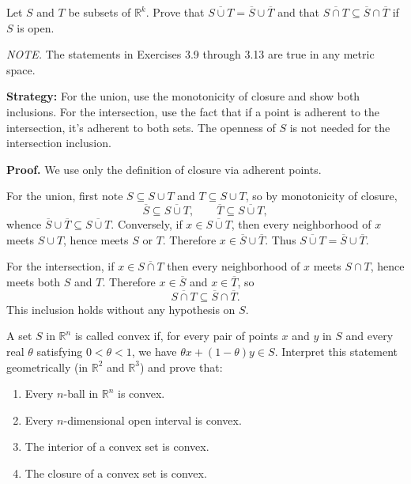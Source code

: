 \begin{problembox}

Let $S$ and $T$ be subsets of $\mathbb{R}^k$. Prove that $\overline{S \cup T} = \overline{S} \cup \overline{T}$ and that $\overline{S \cap T} \subseteq \overline{S} \cap \overline{T}$ if $S$ is open.

\textit{NOTE.} The statements in Exercises 3.9 through 3.13 are true in any metric space.
\end{problembox}

\noindent\textbf{Strategy:} For the union, use the monotonicity of closure and show both inclusions. For the intersection, use the fact that if a point is adherent to the intersection, it's adherent to both sets. The openness of $S$ is not needed for the intersection inclusion.

\noindent\textbf{Proof.}
We use only the definition of closure via adherent points.

For the union, first note $S\subseteq S\cup T$ and $T\subseteq S\cup T$, so by monotonicity of closure,
\[\overline S\subseteq \overline{S\cup T},\qquad \overline T\subseteq \overline{S\cup T},\]
whence $\overline S\cup\overline T\subseteq \overline{S\cup T}$. Conversely, if $x\in \overline{S\cup T}$, then every neighborhood of $x$ meets $S\cup T$, hence meets $S$ or $T$. Therefore $x\in\overline S\cup\overline T$. Thus $\overline{S\cup T}=\overline S\cup\overline T$.

For the intersection, if $x\in \overline{S\cap T}$ then every neighborhood of $x$ meets $S\cap T$, hence meets both $S$ and $T$. Therefore $x\in\overline S$ and $x\in\overline T$, so
\[\overline{S\cap T}\subseteq \overline S\cap \overline T.\]
This inclusion holds without any hypothesis on $S$.



\begin{problembox}
A set \( S \) in \( \mathbb{R}^n \) is called convex if, for every pair of points \( x \) and \( y \) in \( S \) and every real \( \theta \) satisfying \( 0 < \theta < 1 \), we have \( \theta x + (1 - \theta)y \in S \). Interpret this statement geometrically (in \( \mathbb{R}^2 \) and \( \mathbb{R}^3 \)) and prove that:
\begin{enumerate}[label=\alph*)]
\item Every \( n \)-ball in \( \mathbb{R}^n \) is convex.
\item Every \( n \)-dimensional open interval is convex.
\item The interior of a convex set is convex.
\item The closure of a convex set is convex.
\end{enumerate}
\end{problembox}

